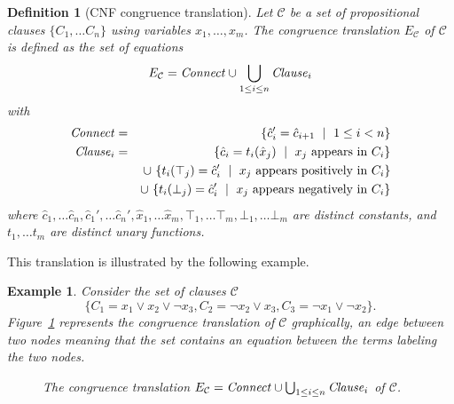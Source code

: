 \documentclass{easychair}
\newtheorem{example}{Example}
\newtheorem{definition}{Definition}
\begin{document}
\begin{definition}[CNF congruence translation]

Let $\mathcal{C}$ be a set of propositional clauses $\{C_1,\ldots C_n\}$ using variables $x_1,\ldots,x_m$.
The \emph{congruence translation} $E_{\mathcal{C}}$ of\/ $\mathcal{C}$ is defined as the set of equations
\begin{equation*}
E_{\mathcal{C}} = {\it Connect} \cup \bigcup_{1 \leq i \leq n}{\it Clause}_i 
\end{equation*}
with
\begin{eqnarray*}
	{\it Connect} &=& \{ \hat{c}_{i}' = \hat{c}_{i+1} \ \mid\ 1 \leq i < n\}\\
        {\it Clause}_i &=& \{ \hat{c}_i = t_i(\hat{x}_j) \ \mid\ x_j \text{ appears in } C_i \}\\
           & & \cup\ \{ t_i(\top_j) = \hat{c}_i' \ \mid\ x_j \text{ appears positively in } C_i \}\\
           & & \cup\ \{ t_i(\bot_j) = \hat{c}_i' \ \mid\ x_j \text{ appears negatively in } C_i \}
\end{eqnarray*}
where $\hat{c}_{1},\dots \hat{c}_{n},\hat{c}_{1}', \dots \hat{c}_{n}',
\hat{x}_1, \dots \hat{x}_m, \top_1, \dots \top_m, \bot_1, \dots \bot_m$ are distinct constants, and $t_1, \dots t_m$ are
distinct unary functions.

\end{definition}

\noindent This translation is illustrated by the following example.

\begin{example}\label{ex:np1}
Consider the set of clauses $\mathcal{C}$
\begin{equation*}
\big\{C_1 = x_1 \vee x_2 \vee \neg x_3, C_2 = \neg x_2 \vee x_3, C_3 = \neg x_1 \vee \neg x_2\big\}.
\end{equation*}
Figure~\ref{fig:npexamplebig} represents the congruence translation of
$\mathcal{C}$ graphically, an edge between two nodes meaning that the set
contains an equation between the terms labeling the two nodes.

\begin{figure}[htb]

\caption{The congruence translation $E_{\mathcal{C}} = {\it Connect} \cup \bigcup_{1 \leq i \leq n}{\it Clause}_i$ of $\mathcal{C}$.}
\label{fig:npexamplebig}
\end{figure}

\end{example}
\end{document}
